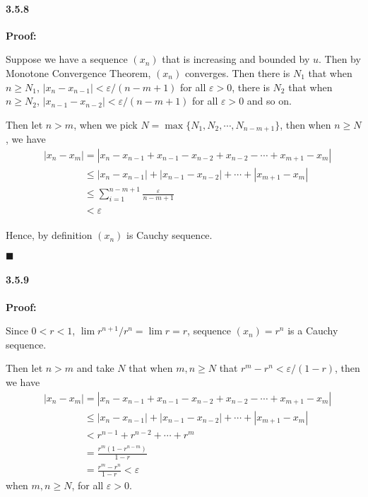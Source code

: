 \documentclass[11pt]{article}
\newcommand{\qed}{
	\begin{flushright}
		$\blacksquare$
	\end{flushright}}
\begin{document}
	\paragraph{3.5.8}\textbf{Proof:}
	
		Suppose we have a sequence $(x_n)$ that is increasing and bounded by $u$. Then by Monotone Convergence Theorem, $(x_n)$ converges. Then there is $N_1$ that when $n \geq N_1$, $|x_n - x_{n - 1}| < \varepsilon / (n - m + 1)$ for all $\varepsilon > 0$, there is $N_2$ that when $n \geq N_2$, $|x_{n - 1} - x_{n - 2}| < \varepsilon / (n - m + 1)$ for all $\varepsilon > 0$ and so on.
		
		Then let $n > m$, when we pick $N = \max\{N_1, N_2, \cdots, N_{n - m + 1}\}$, then when $n \geq N$, we have
		\begin{align}
			&|x_n - x_m| = |x_n - x_{n - 1} + x_{n - 1} - x_{n - 2} + x_{n - 2} - \cdots + x_{m + 1} - x_m|\nonumber\\
			&\phantom{|x_n - x_m|} \leq |x_n - x_{n - 1}| + |x_{n - 1} - x_{n - 2}| + \cdots + |x_{m + 1} - x_m|\nonumber\\
			&\phantom{|x_n - x_m|} \leq \sum_{i = 1}^{n - m + 1} \frac{\varepsilon}{n - m + 1}\nonumber\\
			&\phantom{|x_n - x_m|} < \varepsilon\nonumber
		\end{align}
	
	Hence, by definition $(x_n)$ is Cauchy sequence.
	\qed
	\paragraph{3.5.9}\textbf{Proof:}
		
		Since $0 < r < 1$, $\lim r^{n + 1} / r^n = \lim r = r$, sequence $(x_n) = r^n$ is a Cauchy sequence. 
		
		Then let $n > m$ and take $N$ that when $m, n \geq N$ that $r^m - r^n < \varepsilon / (1 - r)$, then we have
		\begin{align}
			&|x_n - x_m| = |x_n - x_{n - 1} + x_{n - 1} - x_{n - 2} + x_{n - 2} - \cdots + x_{m + 1} - x_m|\nonumber\\
			&\phantom{|x_n - x_m|} \leq |x_n - x_{n - 1}| + |x_{n - 1} - x_{n - 2}| + \cdots + |x_{m + 1} - x_m|\nonumber\\
			&\phantom{|x_n - x_m|} < r^{n - 1} + r^{n - 2} + \cdots + r^m\nonumber\\
			&\phantom{|x_n - x_m|} = \frac{r^m(1 - r^{n -m})}{1 - r}\nonumber\\
			&\phantom{|x_n - x_m|} = \frac{r^m - r^n}{1 - r} < \varepsilon\nonumber
		\end{align}
		when $m, n \geq N$, for all $\varepsilon > 0$.
		
\end{document}

